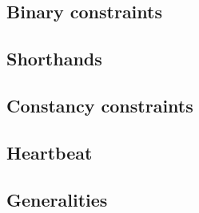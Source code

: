 \subsection{Binary constraints}            \label{mxp: constraints: binary}           
\subsection{Shorthands}                    \label{mxp: constraints: shorthands}       
\subsection{Constancy constraints}         \label{mxp: constraints: constancies}      
\subsection{Heartbeat}                     \label{mxp: constraints: heartbeat}        
\subsection{Generalities}                  \label{mxp: constraints: generalities}     
